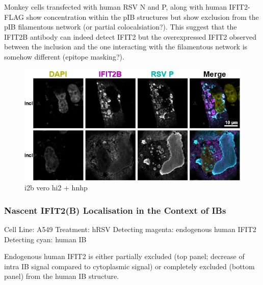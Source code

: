 Monkey cells transfected with human RSV N and P, along with human IFIT2-FLAG show concentration within the pIB structures but show exclusion from the pIB filamentous network (or partial colocalsiation?). This suggest that the IFIT2B antibody can indeed detect IFIT2 but the overexpressed IFIT2 observed between the inclusion and the one interacting with the filamentous network is somehow different (epitope masking?).

\begin{figure}
    \centering
    \includegraphics[width=1\linewidth]{10. Chapter 5//Figs//02. I2B/02. i2b vero i2 hnhp.png}
    \caption[i2b vero hi2 + hnhp]{i2b vero hi2 + hnhp}
    \label{fig:i2b vero hi2 + hnhp}
\end{figure}

\subsubsection{Nascent IFIT2(B) Localisation in the Context of IBs} \label{Nascent IFIT2(B) Localisation in the Context of IBs}
Cell Line: A549 \newline
Treatment: hRSV \newline
Detecting magenta: endogenous human IFIT2  \newline
Detecting cyan: human IB \newline

Endogenous human IFIT2 is either partially excluded (top panel; decrease of intra IB signal compared to cytoplasmic signal) or completely excluded (bottom panel) from the human IB structure.

